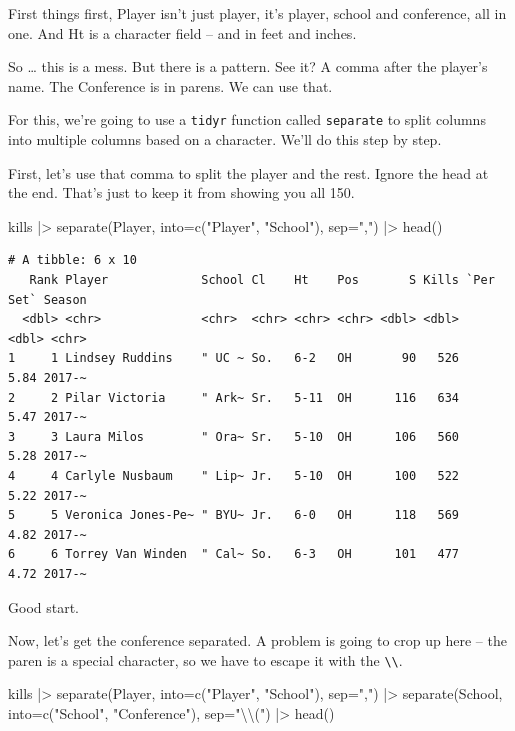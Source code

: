 \documentclass[
  letterpaper,
  DIV=11,
  numbers=noendperiod]{scrreprt}
\newenvironment{Shaded}{\begin{snugshade}}{\end{snugshade}}
\newcommand{\AttributeTok}[1]{\textcolor[rgb]{0.40,0.45,0.13}{#1}}
\newcommand{\FunctionTok}[1]{\textcolor[rgb]{0.28,0.35,0.67}{#1}}
\newcommand{\NormalTok}[1]{\textcolor[rgb]{0.00,0.23,0.31}{#1}}
\newcommand{\SpecialCharTok}[1]{\textcolor[rgb]{0.37,0.37,0.37}{#1}}
\newcommand{\StringTok}[1]{\textcolor[rgb]{0.13,0.47,0.30}{#1}}
\begin{document}
First things first, Player isn't just player, it's player, school and
conference, all in one. And Ht is a character field -- and in feet and
inches.

So \ldots{} this is a mess. But there is a pattern. See it? A comma
after the player's name. The Conference is in parens. We can use that.

For this, we're going to use a \texttt{tidyr} function called
\texttt{separate} to split columns into multiple columns based on a
character. We'll do this step by step.

First, let's use that comma to split the player and the rest. Ignore the
head at the end. That's just to keep it from showing you all 150.

\begin{Shaded}
\begin{Highlighting}[]
\NormalTok{kills }\SpecialCharTok{|\textgreater{}} \FunctionTok{separate}\NormalTok{(Player, }\AttributeTok{into=}\FunctionTok{c}\NormalTok{(}\StringTok{"Player"}\NormalTok{, }\StringTok{"School"}\NormalTok{), }\AttributeTok{sep=}\StringTok{","}\NormalTok{) }\SpecialCharTok{|\textgreater{}} \FunctionTok{head}\NormalTok{()}
\end{Highlighting}
\end{Shaded}

\begin{verbatim}
# A tibble: 6 x 10
   Rank Player             School Cl    Ht    Pos       S Kills `Per Set` Season
  <dbl> <chr>              <chr>  <chr> <chr> <chr> <dbl> <dbl>     <dbl> <chr> 
1     1 Lindsey Ruddins    " UC ~ So.   6-2   OH       90   526      5.84 2017-~
2     2 Pilar Victoria     " Ark~ Sr.   5-11  OH      116   634      5.47 2017-~
3     3 Laura Milos        " Ora~ Sr.   5-10  OH      106   560      5.28 2017-~
4     4 Carlyle Nusbaum    " Lip~ Jr.   5-10  OH      100   522      5.22 2017-~
5     5 Veronica Jones-Pe~ " BYU~ Jr.   6-0   OH      118   569      4.82 2017-~
6     6 Torrey Van Winden  " Cal~ So.   6-3   OH      101   477      4.72 2017-~
\end{verbatim}

Good start.

Now, let's get the conference separated. A problem is going to crop up
here -- the paren is a special character, so we have to escape it with
the \texttt{\textbackslash{}\textbackslash{}}.

\begin{Shaded}
\begin{Highlighting}[]
\NormalTok{kills }\SpecialCharTok{|\textgreater{}} 
  \FunctionTok{separate}\NormalTok{(Player, }\AttributeTok{into=}\FunctionTok{c}\NormalTok{(}\StringTok{"Player"}\NormalTok{, }\StringTok{"School"}\NormalTok{), }\AttributeTok{sep=}\StringTok{","}\NormalTok{) }\SpecialCharTok{|\textgreater{}}
  \FunctionTok{separate}\NormalTok{(School, }\AttributeTok{into=}\FunctionTok{c}\NormalTok{(}\StringTok{"School"}\NormalTok{, }\StringTok{"Conference"}\NormalTok{), }\AttributeTok{sep=}\StringTok{"}\SpecialCharTok{\textbackslash{}\textbackslash{}}\StringTok{("}\NormalTok{) }\SpecialCharTok{|\textgreater{}} 
  \FunctionTok{head}\NormalTok{()}
\end{Highlighting}
\end{Shaded}
\end{document}
